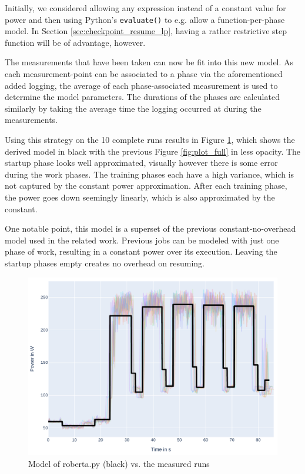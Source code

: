 Initially, we considered allowing any expression instead of a constant value for power and then using Python's \verb|evaluate()| to e.g. allow a function-per-phase model.
In Section \ref{sec:checkpoint_resume_lp}, having a rather restrictive step function will be of advantage, however. 


The measurements that have been taken can now be fit into this new model. 
As each measurement-point can be associated to a phase via the aforementioned added logging, the average of each phase-associated measurement is used to determine the model parameters. 
The durations of the phases are calculated similarly by taking the average time the logging occurred at during the measurements.

Using this strategy on the 10 complete runs results in Figure \ref{fig:model_overlaid}, which shows the derived model in black with the previous Figure \ref{fig:plot_full} in less opacity. 
The startup phase looks well approximated, visually however there is some error during the work phases.
The training phases each have a high variance, which is not captured by the constant power approximation. After each training  phase, the power goes down seemingly linearly, which is also approximated by the constant.

One notable point, this model is a superset of the previous constant-no-overhead model used in the related work.
Previous jobs can be modeled with just one phase of work, resulting in a constant power over its execution. Leaving the startup phases empty creates no overhead on resuming.

\begin{figure}
    \includegraphics[width=\linewidth]{power-measurements/model_overlaid.pdf}
    \caption{Model of roberta.py (black) vs. the measured runs}
    \label{fig:model_overlaid}
\end{figure}

